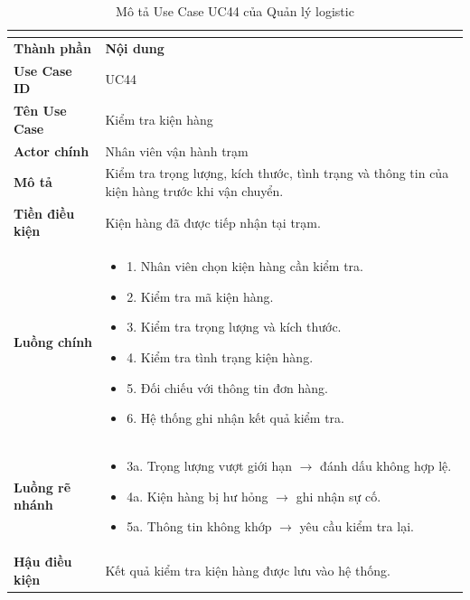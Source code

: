 \begin{longtable}{|C{3cm}|L{11cm}|}
\caption{Mô tả Use Case UC44 của Quản lý logistic}\\
\label{tab:mo-ta-uc44-quan-ly-logistic}\\
\hline
\textbf{Thành phần} & \textbf{Nội dung} \\
\hline
\textbf{Use Case ID} & UC44 \\
\hline
\textbf{Tên Use Case} & Kiểm tra kiện hàng \\
\hline
\textbf{Actor chính} & Nhân viên vận hành trạm \\
\hline
\textbf{Mô tả} & Kiểm tra trọng lượng, kích thước, tình trạng và thông tin của kiện hàng trước khi vận chuyển. \\
\hline
\textbf{Tiền điều kiện} & Kiện hàng đã được tiếp nhận tại trạm. \\
\hline
\textbf{Luồng chính} &
\begin{itemize}[leftmargin=*,topsep=2pt,itemsep=2pt]
    \item 1. Nhân viên chọn kiện hàng cần kiểm tra.
    \item 2. Kiểm tra mã kiện hàng.
    \item 3. Kiểm tra trọng lượng và kích thước.
    \item 4. Kiểm tra tình trạng kiện hàng.
    \item 5. Đối chiếu với thông tin đơn hàng.
    \item 6. Hệ thống ghi nhận kết quả kiểm tra.
\end{itemize} \\
\hline
\textbf{Luồng rẽ nhánh} &
\begin{itemize}[leftmargin=*,topsep=2pt,itemsep=2pt]
    \item 3a. Trọng lượng vượt giới hạn $\rightarrow$ đánh dấu không hợp lệ.
    \item 4a. Kiện hàng bị hư hỏng $\rightarrow$ ghi nhận sự cố.
    \item 5a. Thông tin không khớp $\rightarrow$ yêu cầu kiểm tra lại.
\end{itemize} \\
\hline
\textbf{Hậu điều kiện} & Kết quả kiểm tra kiện hàng được lưu vào hệ thống. \\
\hline
\end{longtable}


